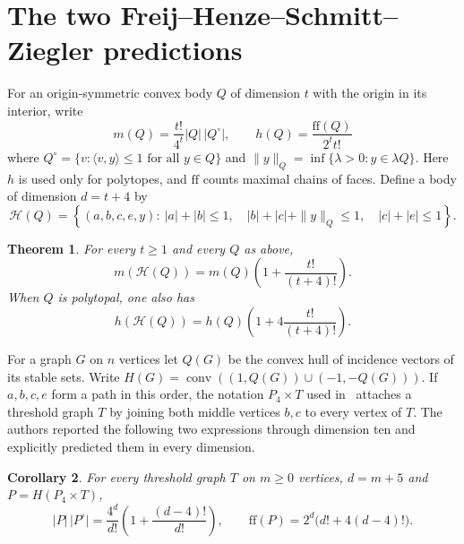 \documentclass[11pt,a4paper]{article}
\numberwithin{equation}{section}
\newtheorem{theorem}{Theorem}[section]
\newtheorem{corollary}[theorem]{Corollary}
\begin{document}
\section{The two Freij--Henze--Schmitt--Ziegler predictions}
\label{sec:hansen-volume}
For an origin-symmetric convex body $Q$ of dimension $t$ with the origin in its interior, write
\[
 m(Q)=\frac{t!}{4^t}|Q|\,|Q^\circ|,\qquad
 h(Q)=\frac{\mathrm{ff}(Q)}{2^t t!}
\]
where $Q^\circ=\{v:\langle v,y\rangle\le1\text{ for all }y\in Q\}$ and $\|y\|_Q=\inf\{\lambda>0:y\in\lambda Q\}$. Here $h$ is used only for polytopes, and $\mathrm{ff}$ counts maximal chains of faces. Define a body of dimension $d=t+4$ by
\begin{equation}
 \mathcal H(Q)=\left\{(a,b,c,e,y):\ |a|+|b|\le1,\quad
 |b|+|c|+\|y\|_Q\le1,\quad |c|+|e|\le1\right\}.
 \label{eq:calH-def}
\end{equation}
\begin{theorem}\label{thm:hansen-lift}
For every $t\ge1$ and every $Q$ as above,
\[
 m(\mathcal H(Q))=m(Q)\left(1+\frac{t!}{(t+4)!}\right).
\]
When $Q$ is polytopal, one also has
\[
 h(\mathcal H(Q))=h(Q)\left(1+4\frac{t!}{(t+4)!}\right).
\]
\end{theorem}

For a graph $G$ on $n$ vertices let $Q(G)$ be the convex hull of incidence vectors of its stable sets. Write $H(G)=\operatorname{conv}((1,Q(G))\cup(-1,-Q(G)))$. If $a,b,c,e$ form a path in this order, the notation $P_4\times T$ used in~\cite{FHSZ} attaches a threshold graph $T$ by joining both middle vertices $b,c$ to every vertex of $T$. The authors reported the following two expressions through dimension ten and explicitly predicted them in every dimension.
\begin{corollary}\label{thm:hansen-flags}
For every threshold graph $T$ on $m\ge0$ vertices, $d=m+5$ and $P=H(P_4\times T)$,
\[
 |P|\,|P^\circ|=\frac{4^d}{d!}\left(1+\frac{(d-4)!}{d!}\right),\qquad
 \mathrm{ff}(P)=2^d\big(d!+4(d-4)!\big).
\]
\end{corollary}
\end{document}
